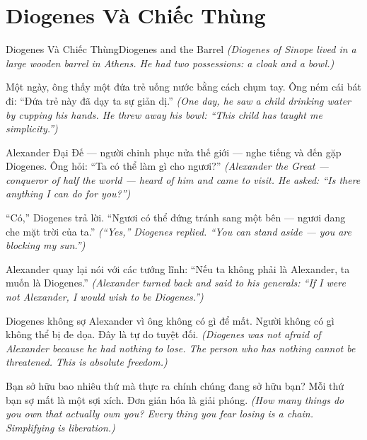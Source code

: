 \section{Diogenes Và Chiếc Thùng}
\begin{truyen}{Diogenes Và Chiếc Thùng}{Diogenes and the Barrel}
\textit{(Diogenes of Sinope lived in a large wooden barrel in Athens. He had two possessions: a cloak and a bowl.)}

Một ngày, ông thấy một đứa trẻ uống nước bằng cách chụm tay. Ông ném cái bát đi: ``Đứa trẻ này đã dạy ta sự giản dị.''
\textit{(One day, he saw a child drinking water by cupping his hands. He threw away his bowl: ``This child has taught me simplicity.'')}

Alexander Đại Đế — người chinh phục nửa thế giới — nghe tiếng và đến gặp Diogenes. Ông hỏi: ``Ta có thể làm gì cho ngươi?''
\textit{(Alexander the Great — conqueror of half the world — heard of him and came to visit. He asked: ``Is there anything I can do for you?'')}

``Có,'' Diogenes trả lời. ``Ngươi có thể đứng tránh sang một bên — ngươi đang che mặt trời của ta.''
\textit{(``Yes,'' Diogenes replied. ``You can stand aside — you are blocking my sun.'')}

Alexander quay lại nói với các tướng lĩnh: ``Nếu ta không phải là Alexander, ta muốn là Diogenes.''
\textit{(Alexander turned back and said to his generals: ``If I were not Alexander, I would wish to be Diogenes.'')}

Diogenes không sợ Alexander vì ông không có gì để mất. Người không có gì không thể bị đe dọa. Đây là tự do tuyệt đối.
\textit{(Diogenes was not afraid of Alexander because he had nothing to lose. The person who has nothing cannot be threatened. This is absolute freedom.)}

\end{truyen}

\begin{baihoc}
Bạn sở hữu bao nhiêu thứ mà thực ra chính chúng đang sở hữu bạn? Mỗi thứ bạn sợ mất là một sợi xích. Đơn giản hóa là giải phóng.
\textit{(How many things do you own that actually own you? Every thing you fear losing is a chain. Simplifying is liberation.)}
\end{baihoc}
\ngancach

